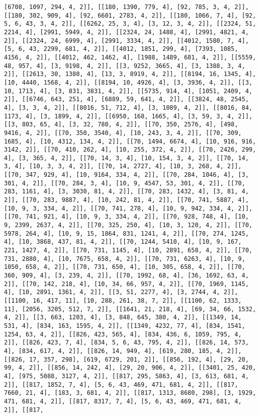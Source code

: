 \documentclass[12pt,fleqn]{article}\usepackage{../../common}
\begin{document}
\begin{verbatim}
[6708, 1097, 294, 4, 2]], [[180, 1390, 779, 4], [92, 785, 3, 4, 2]], [[180, 302, 909, 4], [92, 6601, 2783, 4, 2]], [[180, 1066, 7, 4], [92, 5, 6, 43, 3, 4, 2]], [[6262, 25, 3, 4], [3, 12, 3, 4, 2]], [[2324, 51, 2214, 4], [2991, 5949, 4, 2]], [[2324, 24, 1488, 4], [2991, 4821, 4, 2]], [[2324, 24, 6999, 4], [2991, 3334, 4, 2]], [[4012, 1580, 7, 4], [5, 6, 43, 2299, 681, 4, 2]], [[4012, 1851, 299, 4], [7393, 1085, 4156, 4, 2]], [[4012, 462, 1462, 4], [1988, 1489, 681, 4, 2]], [[5559, 48, 957, 4], [3, 9198, 4, 2]], [[3, 9252, 3665, 4], [3, 1388, 3, 4, 2]], [[2613, 30, 1380, 4], [13, 3, 8919, 4, 2]], [[8194, 16, 1345, 4], [10, 4440, 1568, 4, 2]], [[8194, 10, 4926, 4], [3, 3936, 4, 2]], [[3, 10, 1713, 4], [3, 831, 3831, 4, 2]], [[5735, 914, 4], [1051, 2409, 4, 2]], [[6746, 643, 251, 4], [6889, 59, 641, 4, 2]], [[3824, 48, 2545, 4], [3, 3, 4, 2]], [[8016, 51, 712, 4], [3, 1089, 4, 2]], [[8016, 84, 1173, 4], [3, 1899, 4, 2]], [[6950, 168, 1665, 4], [3, 59, 3, 4, 2]], [[3, 803, 65, 4], [3, 32, 780, 4, 2]], [[70, 350, 2576, 4], [498, 9416, 4, 2]], [[70, 350, 3540, 4], [10, 243, 3, 4, 2]], [[70, 309, 1685, 4], [10, 4312, 134, 4, 2]], [[70, 1494, 6674, 4], [10, 916, 916, 3142, 2]], [[70, 410, 262, 4], [10, 255, 372, 4, 2]], [[70, 2426, 299, 4], [3, 365, 4, 2]], [[70, 14, 3, 4], [10, 154, 3, 4, 2]], [[70, 14, 3, 4], [10, 3, 3, 4, 2]], [[70, 14, 2727, 4], [10, 3, 268, 4, 2]], [[70, 347, 929, 4], [10, 9164, 334, 4, 2]], [[70, 284, 1046, 4], [3, 301, 4, 2]], [[70, 284, 3, 4], [10, 9, 4547, 53, 301, 4, 2]], [[70, 283, 1161, 4], [3, 3030, 81, 4, 2]], [[70, 283, 1432, 4], [3, 81, 4, 2]], [[70, 283, 9887, 4], [10, 242, 81, 4, 2]], [[70, 741, 5887, 4], [10, 9, 3, 334, 4, 2]], [[70, 741, 278, 4], [10, 9, 942, 334, 4, 2]], [[70, 741, 921, 4], [10, 9, 3, 334, 4, 2]], [[70, 928, 748, 4], [10, 9, 2399, 2637, 4, 2]], [[70, 325, 250, 4], [10, 3, 120, 4, 2]], [[70, 5978, 264, 4], [10, 9, 15, 1864, 831, 1241, 4, 2]], [[70, 274, 1245, 4], [10, 3868, 437, 81, 4, 2]], [[70, 1244, 5410, 4], [10, 9, 167, 221, 1427, 4, 2]], [[70, 731, 1145, 4], [10, 2891, 658, 4, 2]], [[70, 731, 2880, 4], [10, 7675, 658, 4, 2]], [[70, 731, 6263, 4], [10, 9, 1050, 658, 4, 2]], [[70, 731, 650, 4], [10, 305, 658, 4, 2]], [[70, 360, 909, 4], [3, 239, 4, 2]], [[70, 1992, 68, 4], [36, 1692, 63, 4, 2]], [[70, 142, 218, 4], [10, 34, 66, 957, 4, 2]], [[70, 1969, 1145, 4], [10, 2891, 1361, 4, 2]], [[3, 51, 2277, 4], [3, 2744, 4, 2]], [[1100, 16, 417, 11], [10, 288, 261, 38, 7, 2]], [[1100, 62, 1333, 11], [2056, 3205, 512, 7, 2]], [[1641, 21, 218, 4], [69, 34, 66, 1532, 4, 2]], [[3, 663, 1203, 4], [3, 848, 645, 380, 4, 2]], [[1349, 14, 531, 4], [834, 163, 1595, 4, 2]], [[1349, 4232, 77, 4], [834, 1541, 1254, 63, 4, 2]], [[826, 423, 565, 4], [834, 436, 6, 1059, 795, 4, 2]], [[826, 423, 7, 4], [834, 5, 6, 43, 795, 4, 2]], [[826, 14, 573, 4], [834, 617, 4, 2]], [[826, 14, 949, 4], [619, 280, 185, 4, 2]], [[826, 17, 357, 298], [619, 6729, 201, 2]], [[856, 192, 4], [29, 20, 99, 4, 2]], [[856, 14, 242, 4], [29, 20, 906, 4, 2]], [[3401, 25, 420, 4], [975, 5088, 3127, 4, 2]], [[817, 295, 5863, 4], [3, 613, 681, 4, 2]], [[817, 1852, 7, 4], [5, 6, 43, 469, 471, 681, 4, 2]], [[817, 7660, 21, 4], [183, 3, 681, 4, 2]], [[817, 1313, 8680, 298], [3, 1929, 471, 681, 4, 2]], [[817, 8317, 7, 4], [5, 6, 43, 469, 471, 681, 4, 2]], [[817, 
\end{verbatim}
\end{document}
